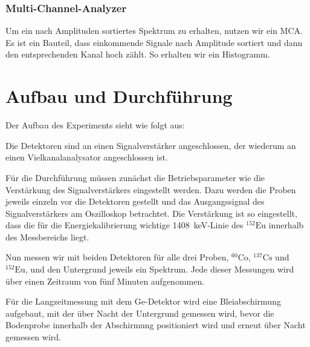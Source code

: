 \documentclass[11pt, ngerman, fleqn, DIV=15, headinclude, BCOR=2cm]{scrreprt}
\begin{document}
\subsection{Multi-Channel-Analyzer}

Um ein nach Amplituden sortiertes Spektrum zu erhalten, nutzen wir ein MCA.
Es ist ein Bauteil, dass einkommende Signale nach Amplitude sortiert und
dann den entsprechenden Kanal hoch zählt. So erhalten wir ein
Histogramm.



\chapter{Aufbau und Durchführung}

Der Aufbau des Experiments sieht wie folgt aus:

Die Detektoren sind an einen Signalverstärker angeschlossen, der
wiederum an einen Vielkanalanalysator angeschlossen ist.

Für die Durchführung müssen zunächst die Betriebsparameter wie die
Verstärkung des Signalverstärkers eingestellt werden.
Dazu werden die Proben jeweils einzeln vor die Detektoren gestellt und das
Ausgangssignal des Signalverstärkers am Oszilloskop betrachtet.
Die Verstärkung ist so eingestellt, dass die für die Energiekalibrierung
wichtige \SI{1408}{\kilo\electronvolt}-Linie des $^{152}\text{Eu}$
innerhalb des Messbereichs liegt.

Nun messen wir mit beiden Detektoren für alle drei Proben, $^{60}\text{Co}$,
$^{137}\text{Cs}$ und $^{152}\text{Eu}$, und den Untergrund jeweils ein
Spektrum. Jede dieser Messungen wird über einen Zeitraum von fünf Minuten aufgenommen.

Für die Langzeitmessung mit dem Ge-Detektor wird eine Bleiabschirmung
aufgebaut, mit der über Nacht der Untergrund gemessen wird, bevor die Bodenprobe
innerhalb der Abschirmung positioniert wird und erneut über Nacht gemessen wird.
\end{document}
